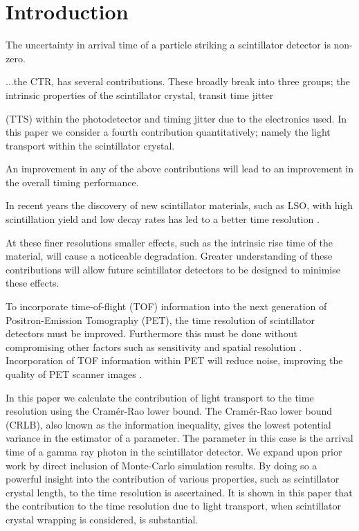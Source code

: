 \section*{Introduction}
The uncertainty in arrival time of a particle striking a scintillator detector is non-zero. 


...the CTR, has several contributions. These broadly break into three groups; the intrinsic properties of the scintillator crystal, transit time jitter %

(TTS) within the photodetector and timing jitter due to the electronics used. In this paper we consider a fourth contribution quantitatively; namely the light transport within the scintillator crystal. 

An improvement in any of the above contributions will lead to an improvement in the overall timing performance.

In recent years the discovery of new scintillator materials, such as LSO, with high scintillation yield and low decay rates has led to a better time resolution \cite{Dorenbos2010a,Conti2009a}. 

At these finer resolutions smaller effects, such as the intrinsic rise time of the material, will cause a noticeable degradation. Greater understanding of these contributions will allow future scintillator detectors to be designed to minimise these effects. 

To incorporate time-of-flight (TOF) information into the next generation of Positron-Emission Tomography (PET), the time resolution of scintillator detectors must be improved. Furthermore this must be done without compromising other factors such as sensitivity and spatial resolution \cite{Eriksson2004}. Incorporation of TOF information within PET will reduce noise, improving the quality of PET scanner images \cite{Geramifar2011}.

In this paper we calculate the contribution of light transport to the time resolution using the Cram\'{e}r-Rao lower bound. The Cram\'{e}r-Rao lower bound (CRLB), also known as the information inequality, gives the lowest potential variance in the estimator of a parameter. The parameter in this case is the arrival time of a
gamma ray photon in the scintillator detector. We expand upon prior work \cite{Seifert2012} by direct inclusion of Monte-Carlo simulation results. By doing so a powerful insight into the contribution of various properties, such as scintillator crystal length, to the time resolution is ascertained. It is shown in this paper that the contribution to the time resolution due to light transport, when scintillator crystal wrapping is considered, is substantial.